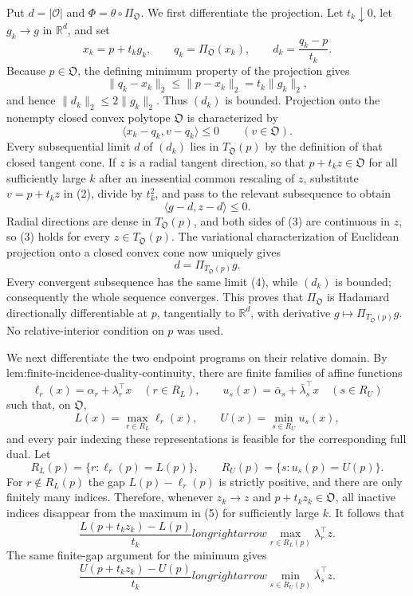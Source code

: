 Put \(d=|\mathcal O|\) and \(\Phi=\theta\circ\Pi_{\mathfrak O}\).  We first differentiate the projection.  Let \(t_k\downarrow0\), let \(g_k\to g\) in \(\mathbb R^d\), and set
\[
x_k=p+t_kg_k,\qquad q_k=\Pi_{\mathfrak O}(x_k),\qquad d_k=\frac{q_k-p}{t_k}.
\tag{1}
\]
Because \(p\in\mathfrak O\), the defining minimum property of the projection gives
\[
\|q_k-x_k\|_2\leq \|p-x_k\|_2=t_k\|g_k\|_2,
\]
and hence \(\|d_k\|_2\leq2\|g_k\|_2\).  Thus \((d_k)\) is bounded.  Projection onto the nonempty closed convex polytope \(\mathfrak O\) is characterized by
\[
\langle x_k-q_k,v-q_k\rangle\leq0
\qquad(v\in\mathfrak O).
\tag{2}
\]
Every subsequential limit \(d\) of \((d_k)\) lies in \(T_{\mathfrak O}(p)\) by the definition of that closed tangent cone.  If \(z\) is a radial tangent direction, so that \(p+t_kz\in\mathfrak O\) for all sufficiently large \(k\) after an inessential common rescaling of \(z\), substitute \(v=p+t_kz\) in (2), divide by \(t_k^2\), and pass to the relevant subsequence to obtain
\[
\langle g-d,z-d\rangle\leq0.
\tag{3}
\]
Radial directions are dense in \(T_{\mathfrak O}(p)\), and both sides of (3) are continuous in \(z\), so (3) holds for every \(z\in T_{\mathfrak O}(p)\).  The variational characterization of Euclidean projection onto a closed convex cone now uniquely gives
\[
d=\Pi_{T_{\mathfrak O}(p)}g.
\tag{4}
\]
Every convergent subsequence has the same limit (4), while \((d_k)\) is bounded; consequently the whole sequence converges.  This proves that \(\Pi_{\mathfrak O}\) is Hadamard directionally differentiable at \(p\), tangentially to \(\mathbb R^d\), with derivative \(g\mapsto\Pi_{T_{\mathfrak O}(p)}g\).  No relative-interior condition on \(p\) was used.

We next differentiate the two endpoint programs on their relative domain.  By \(\text{lem:finite-incidence-duality-continuity}\), there are finite families of affine functions
\[
\ell_r(x)=\alpha_r+\lambda_r^{\top}x\quad(r\in R_L),
\qquad
u_s(x)=\bar\alpha_s+\bar\lambda_s^{\top}x\quad(s\in R_U)
\]
such that, on \(\mathfrak O\),
\[
L(x)=\max_{r\in R_L}\ell_r(x),
\qquad
U(x)=\min_{s\in R_U}u_s(x),
\tag{5}
\]
and every pair indexing these representations is feasible for the corresponding full dual.  Let
\[
R_L(p)=\{r:\ell_r(p)=L(p)\},
\qquad
R_U(p)=\{s:u_s(p)=U(p)\}.
\]
For \(r\notin R_L(p)\) the gap \(L(p)-\ell_r(p)\) is strictly positive, and there are only finitely many indices.  Therefore, whenever \(z_k\to z\) and \(p+t_kz_k\in\mathfrak O\), all inactive indices disappear from the maximum in (5) for sufficiently large \(k\).  It follows that
\[
\frac{L(p+t_kz_k)-L(p)}{t_k}longrightarrow
\max_{r\in R_L(p)}\lambda_r^{\top}z.
\tag{6}
\]
The same finite-gap argument for the minimum gives
\[
\frac{U(p+t_kz_k)-U(p)}{t_k}longrightarrow
\min_{s\in R_U(p)}\bar\lambda_s^{\top}z.
\tag{7}
\]


